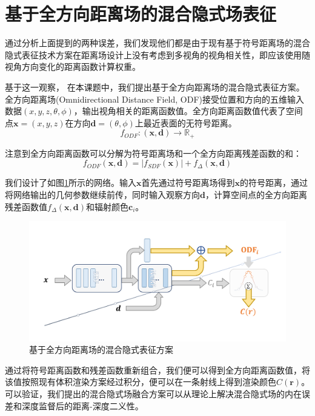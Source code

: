 \section{基于全方向距离场的混合隐式场表征}
通过分析上面提到的两种误差，我们发现他们都是由于现有基于符号距离场的混合隐式表征技术方案在距离场设计上没有考虑到多视角的视角相关性，即应该使用随视角方向变化的距离函数计算权重。

基于这一观察， 在本课题中，我们提出基于全方向距离场的混合隐式表征方案。全方向距离场(Omnidirectional Distance Field, ODF)接受位置和方向的五维输入数据$(x,y,z,\theta,\phi)$，输出视角相关的距离函数值。全方向距离函数值代表了空间点$\mathbf{x}=(x,y,z)$在方向$\mathbf{d}=(\theta,\phi)$上最近表面的无符号距离。
\begin{equation}
    f_{ODF}: (\mathbf{x},\mathbf{d})\to \mathbb{R}_+
    \label{eq: omninerf-odf function}
\end{equation}

注意到全方向距离函数可以分解为符号距离场和一个全方向距离残差函数的和：
\begin{equation}
    f_{ODF}(\mathbf{x}, \mathbf{d}) = |f_{SDF}(\mathbf{x})| + f_\Delta(\mathbf{x}, \mathbf{d})
    \label{eq: omninerf-odf decomposition}
\end{equation}

我们设计了如图\ref{fig:omninerf-model}所示的网络。输入$\mathbf{x}$首先通过符号距离场得到$\mathbf{x}$的符号距离，通过将网络输出的几何参数继续前传，同时输入观察方向$\mathbf{d}$，计算空间点的全方向距离残差函数值$f_\Delta(\mathbf{x},\mathbf{d})$和辐射颜色$\mathbf{c}_i$。

\begin{figure}[ht]
    \centering
    \includegraphics[width=\textwidth]{undergraduate-thesis/images/omni-nerf/omninerf-model.pdf}
    \caption{基于全方向距离场的混合隐式表征方案}
    \label{fig:omninerf-model}
\end{figure}

通过将符号距离函数和残差函数重新组合，我们便可以得到全方向距离函数值，将该值按照现有体积渲染方案经过积分，便可以在一条射线上得到渲染颜色$C(\mathbf{r})$。 可以验证，我们提出的混合隐式场融合方案可以从理论上解决混合隐式场的内在误差和深度监督后的距离-深度二义性。

